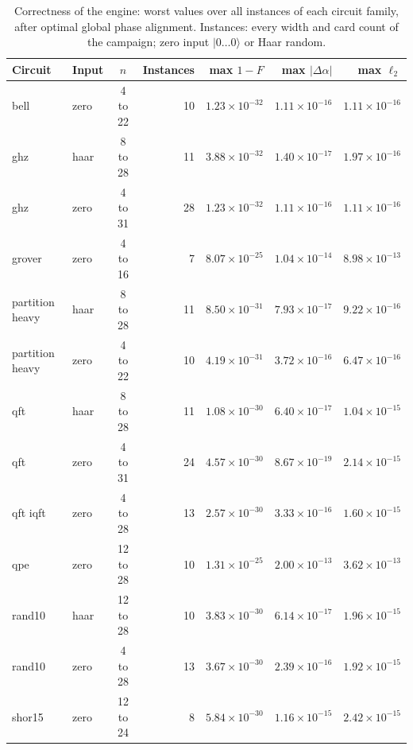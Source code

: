 \documentclass[pdflatex,sn-mathphys-num]{sn-jnl}
\newcommand{\ket}[1]{\lvert #1\rangle}
\theoremstyle{thmstyleone}
\theoremstyle{thmstylethree}
\begin{document}
\begin{table}[t]
\caption{Correctness of the engine: worst values over all instances of each circuit family, after optimal
global phase alignment. Instances: every width and card count of the campaign; zero input $\ket{0\dots0}$ or Haar random.}\label{tab:correctness}
\begin{tabular}{@{}llcrrrr@{}}
\toprule
Circuit & Input & $n$ & Instances & max $1-F$ & max $|\Delta\alpha|$ & max $\ell_2$ \\
\midrule
bell & zero & 4 to 22 & 10 & $1.23\times 10^{-32}$ & $1.11\times 10^{-16}$ & $1.11\times 10^{-16}$ \\
ghz & haar & 8 to 28 & 11 & $3.88\times 10^{-32}$ & $1.40\times 10^{-17}$ & $1.97\times 10^{-16}$ \\
ghz & zero & 4 to 31 & 28 & $1.23\times 10^{-32}$ & $1.11\times 10^{-16}$ & $1.11\times 10^{-16}$ \\
grover & zero & 4 to 16 & 7 & $8.07\times 10^{-25}$ & $1.04\times 10^{-14}$ & $8.98\times 10^{-13}$ \\
partition heavy & haar & 8 to 28 & 11 & $8.50\times 10^{-31}$ & $7.93\times 10^{-17}$ & $9.22\times 10^{-16}$ \\
partition heavy & zero & 4 to 22 & 10 & $4.19\times 10^{-31}$ & $3.72\times 10^{-16}$ & $6.47\times 10^{-16}$ \\
qft & haar & 8 to 28 & 11 & $1.08\times 10^{-30}$ & $6.40\times 10^{-17}$ & $1.04\times 10^{-15}$ \\
qft & zero & 4 to 31 & 24 & $4.57\times 10^{-30}$ & $8.67\times 10^{-19}$ & $2.14\times 10^{-15}$ \\
qft iqft & zero & 4 to 28 & 13 & $2.57\times 10^{-30}$ & $3.33\times 10^{-16}$ & $1.60\times 10^{-15}$ \\
qpe & zero & 12 to 28 & 10 & $1.31\times 10^{-25}$ & $2.00\times 10^{-13}$ & $3.62\times 10^{-13}$ \\
rand10 & haar & 12 to 28 & 10 & $3.83\times 10^{-30}$ & $6.14\times 10^{-17}$ & $1.96\times 10^{-15}$ \\
rand10 & zero & 4 to 28 & 13 & $3.67\times 10^{-30}$ & $2.39\times 10^{-16}$ & $1.92\times 10^{-15}$ \\
shor15 & zero & 12 to 24 & 8 & $5.84\times 10^{-30}$ & $1.16\times 10^{-15}$ & $2.42\times 10^{-15}$ \\
\bottomrule
\end{tabular}
\end{table}
\end{document}
